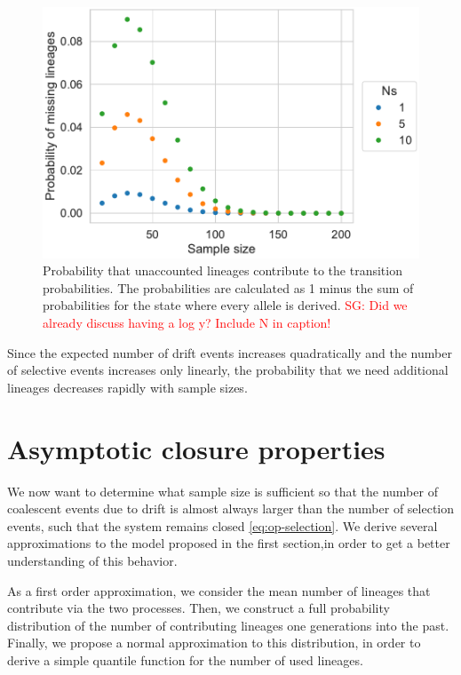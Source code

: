 \documentclass[review]{elsarticle}
\newcommand{\sgcomment}[1]{\textcolor{red}{SG: #1}}
\begin{document}
\begin{figure}
  \centering
  \includegraphics[]{fig/missing.pdf}
  \caption{Probability that unaccounted lineages contribute to the transition probabilities. The
    probabilities are calculated as 1 minus the sum of probabilities for the state where every
    allele is derived. \sgcomment{Did we already discuss having a log y? Include N in caption!}}
    \label{fig:missing}
\end{figure}

Since the expected number of drift events increases quadratically and the number of selective events increases only linearly, the probability that we need additional lineages decreases rapidly with sample sizes. 

\section{Asymptotic closure properties}

We now want to determine what sample size is sufficient so that the number of coalescent events due
to drift is almost always larger than the number of selection events, such that the system remains closed
\eqref{eq:op-selection}. We derive several approximations to the model proposed in the first
section,in order to get a better understanding of this behavior.

As a first order approximation, we consider the mean number of lineages that contribute via the two
processes. Then, we construct a full probability distribution of the number of contributing lineages
one generations into the past. Finally, we propose a normal approximation to this distribution, in
order to derive a simple quantile function for the number of used lineages.
\end{document}
